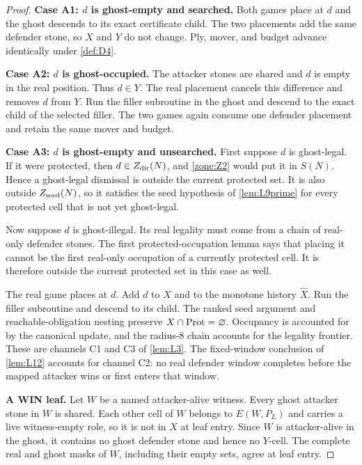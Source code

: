 \begin{proof}
\smallskip\noindent
\textbf{Case A1: $d$ is ghost-empty and searched.}
Both games place at $d$ and the ghost descends to its exact certificate child.
The two placements add the same defender stone, so $X$ and $Y$ do not change.
Ply, mover, and budget advance identically under \cref{def:D4}.

\smallskip\noindent
\textbf{Case A2: $d$ is ghost-occupied.}
The attacker stones are shared and $d$ is empty in the real position.  Thus
$d\in Y$.  The real placement cancels this difference and removes $d$ from
$Y$.  Run the filler subroutine in the ghost and descend to the exact child
of the selected filler.  The two games again consume one defender placement
and retain the same mover and budget.

\smallskip\noindent
\textbf{Case A3: $d$ is ghost-empty and unsearched.}
First suppose $d$ is ghost-legal.  If it were protected, then
$d\in Z_{\mathrm{dir}}(N)$, and \cref{zone:Z2} would put it in $S(N)$.  Hence a
ghost-legal dismissal is outside the current protected set.  It is also
outside $Z_{\mathrm{seed}}(N)$, so it satisfies the seed hypothesis of
\cref{lem:L9prime} for every protected cell that is not yet ghost-legal.

Now suppose $d$ is ghost-illegal.  Its real legality must come from a chain of
real-only defender stones.  The first protected-occupation lemma says that
placing it cannot be the first real-only occupation of a currently protected
cell.  It is therefore outside the current protected set in this case as
well.

The real game places at $d$.  Add $d$ to $X$ and to the monotone history
$\widehat X$.  Run the filler subroutine and descend to its child.  The ranked
seed argument and reachable-obligation nesting preserve
$X\cap\operatorname{Prot}=\varnothing$.  Occupancy is accounted for by the canonical
update, and the radius-$8$ chain accounts for the legality frontier.  These
are channels C1 and C3 of \cref{lem:L3}.  The fixed-window conclusion of
\cref{lem:L12} accounts for channel C2: no real defender window completes
before the mapped attacker wins or first enters that window.

\medskip\noindent
\textbf{A WIN leaf.}
Let $W$ be a named attacker-alive witness.  Every ghost attacker stone in
$W$ is shared.  Each other cell of $W$ belongs to $E(W,P_L)$ and carries a
live witness-empty role, so it is not in $X$ at leaf entry.  Since $W$ is
attacker-alive in the ghost, it contains no ghost defender stone and hence no
$Y$-cell.  The complete real and ghost masks of $W$, including their empty
sets, agree at leaf entry.


\end{proof}
